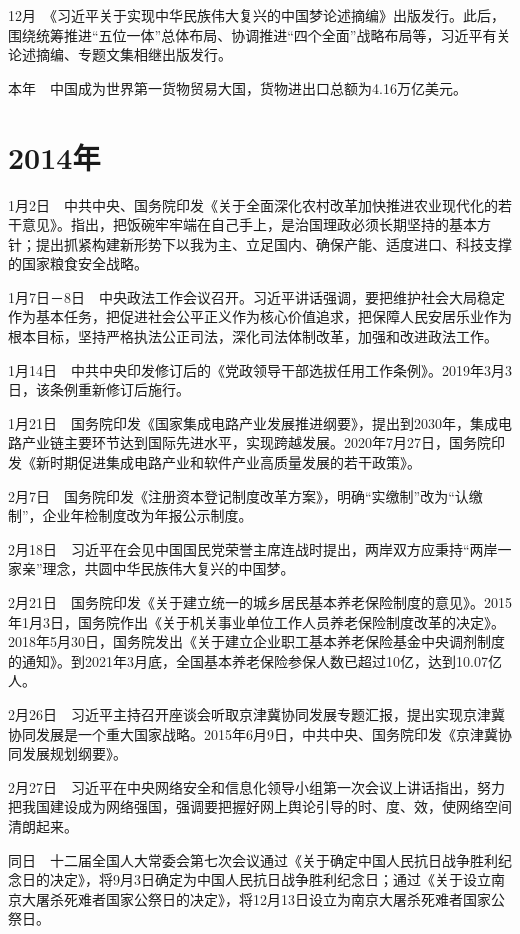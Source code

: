 \documentclass[10pt,a4paper,twocolumn]{book}
\begin{document}
12月　《习近平关于实现中华民族伟大复兴的中国梦论述摘编》出版发行。此后，围绕统筹推进“五位一体”总体布局、协调推进“四个全面”战略布局等，习近平有关论述摘编、专题文集相继出版发行。

本年　中国成为世界第一货物贸易大国，货物进出口总额为4.16万亿美元。

\section{2014年}

1月2日　中共中央、国务院印发《关于全面深化农村改革加快推进农业现代化的若干意见》。指出，把饭碗牢牢端在自己手上，是治国理政必须长期坚持的基本方针；提出抓紧构建新形势下以我为主、立足国内、确保产能、适度进口、科技支撑的国家粮食安全战略。

1月7日－8日　中央政法工作会议召开。习近平讲话强调，要把维护社会大局稳定作为基本任务，把促进社会公平正义作为核心价值追求，把保障人民安居乐业作为根本目标，坚持严格执法公正司法，深化司法体制改革，加强和改进政法工作。

1月14日　中共中央印发修订后的《党政领导干部选拔任用工作条例》。2019年3月3日，该条例重新修订后施行。

1月21日　国务院印发《国家集成电路产业发展推进纲要》，提出到2030年，集成电路产业链主要环节达到国际先进水平，实现跨越发展。2020年7月27日，国务院印发《新时期促进集成电路产业和软件产业高质量发展的若干政策》。

2月7日　国务院印发《注册资本登记制度改革方案》，明确“实缴制”改为“认缴制”，企业年检制度改为年报公示制度。

2月18日　习近平在会见中国国民党荣誉主席连战时提出，两岸双方应秉持“两岸一家亲”理念，共圆中华民族伟大复兴的中国梦。

2月21日　国务院印发《关于建立统一的城乡居民基本养老保险制度的意见》。2015年1月3日，国务院作出《关于机关事业单位工作人员养老保险制度改革的决定》。2018年5月30日，国务院发出《关于建立企业职工基本养老保险基金中央调剂制度的通知》。到2021年3月底，全国基本养老保险参保人数已超过10亿，达到10.07亿人。

2月26日　习近平主持召开座谈会听取京津冀协同发展专题汇报，提出实现京津冀协同发展是一个重大国家战略。2015年6月9日，中共中央、国务院印发《京津冀协同发展规划纲要》。

2月27日　习近平在中央网络安全和信息化领导小组第一次会议上讲话指出，努力把我国建设成为网络强国，强调要把握好网上舆论引导的时、度、效，使网络空间清朗起来。

同日　十二届全国人大常委会第七次会议通过《关于确定中国人民抗日战争胜利纪念日的决定》，将9月3日确定为中国人民抗日战争胜利纪念日；通过《关于设立南京大屠杀死难者国家公祭日的决定》，将12月13日设立为南京大屠杀死难者国家公祭日。
\end{document}
